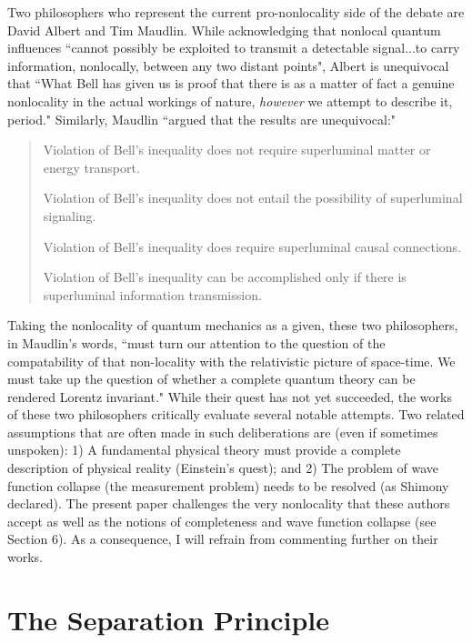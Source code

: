 \documentclass[12pt]{article}
\begin{document}
Two philosophers who represent the current pro-nonlocality side of the debate are David Albert and Tim Maudlin.
While acknowledging that nonlocal quantum influences ``cannot possibly be exploited to transmit a detectable signal...to carry information, nonlocally, between any two distant points", Albert \cite{Alb92} is unequivocal that ``What Bell has given us is proof that there is as a matter of fact a genuine nonlocality in the actual workings of nature, {\it however} we attempt to describe it, period."  Similarly, Maudlin \cite{Mau11} ``argued that the results are unequivocal:"
\begin{quote}

Violation of Bell's inequality does not require superluminal matter or energy transport.

Violation of Bell's inequality does not entail the possibility of superluminal signaling.

Violation of Bell's inequality does require superluminal causal connections.

Violation of Bell's inequality can be accomplished only if there is superluminal information transmission.
\end{quote}

Taking the nonlocality of quantum mechanics as a given, these two philosophers, in Maudlin's words\cite{Mau11},  ``must turn our attention to the question of the compatability of that non-locality with the relativistic picture of space-time.  We must take up the question of whether a complete quantum theory can be rendered Lorentz invariant."  While their quest has not yet succeeded, the works of these two philosophers critically evaluate several notable attempts.  Two related assumptions that are often made in such deliberations are (even if sometimes unspoken): 1) A fundamental physical theory must provide a complete description of physical reality (Einstein's quest); and 2) The problem of wave function collapse (the measurement problem) needs to be resolved (as Shimony declared).  The present paper challenges the very nonlocality that these authors accept as well as the notions of completeness and wave function collapse (see Section 6).  As a consequence, I will refrain from commenting further on their works.

\section{The Separation Principle}\label{SP}
\end{document}

